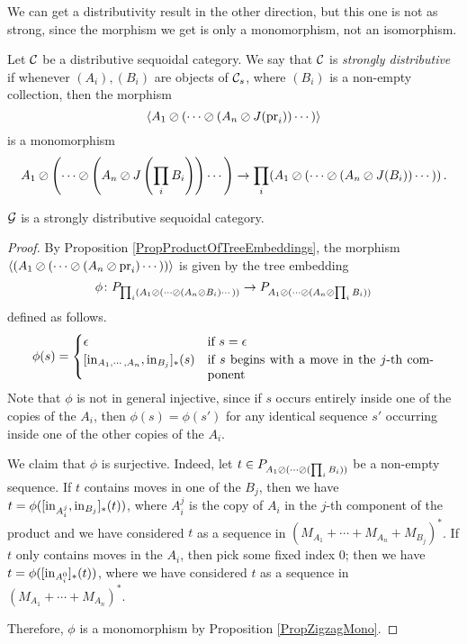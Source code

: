 \documentclass[11pt]{report}
\begin{document}
We can get a distributivity result in the other direction, but this one is not as strong, since the morphism we get is only a monomorphism, not an isomorphism.
\begin{definition}
  Let ${\mathcal{C}}$ be a distributive sequoidal category.  
  We say that ${\mathcal{C}}$ is \emph{strongly distributive} if whenever $(A_i),(B_i)$ are objects of ${\mathcal{C}}_s$, where $(B_i)$ is a non-empty collection, then the morphism
  \[
    \langle A_1 \oslash(\cdots \oslash (A_n \oslash J(\operatorname{pr}_i))\cdots)\rangle
    \]
  is a monomorphism
  \[
    A_1 \oslash\left(\cdots\oslash\left(A_n \oslash J\left(\prod_iB_i\right)\right)\cdots\right) \to \prod_i (A_1 \oslash (\cdots \oslash (A_n \oslash J(B_i))\cdots))\,.
    \]
\end{definition}

\begin{proposition}
  $\mathcal G$ is a strongly distributive sequoidal category.
\end{proposition}
\begin{proof}
  By Proposition \ref{PropProductOfTreeEmbeddings}, the morphism $\langle (A_1\oslash(\cdots\oslash(A_n \oslash\operatorname{pr}_i)\cdots))\rangle$ is given by the tree embedding 
  \[
    \phi\colon P_{\prod_i (A_1 \oslash(\cdots\oslash(A_n\oslash B_i)\cdots))} \to P_{A_1\oslash(\cdots\oslash(A_n\oslash \prod_iB_i))}
    \]
  defined as follows.
  \[
    \phi(s) = \begin{cases}
      \epsilon & \text{if $s=\epsilon$} \\
      [\inj_{A_1,\cdots,A_n},\inj_{B_j}]_*(s) & \parbox[t][][t]{180pt}{if $s$ begins with a move in the $j$-th component}
    \end{cases}
    \]
  Note that $\phi$ is not in general injective, since if $s$ occurs entirely inside one of the copies of the $A_i$, then $\phi(s)=\phi(s')$ for any identical sequence $s'$ occurring inside one of the other copies of the $A_i$.

  We claim that $\phi$ is surjective.  
  Indeed, let $t\in P_{A_1\oslash(\cdots \oslash(\prod_i B_i))}$ be a non-empty sequence.  
  If $t$ contains moves in one of the $B_j$, then we have $t=\phi([\operatorname{in}_{A_i^j},\operatorname{in}_{B_j}]_*(t))$, where $A_i^j$ is the copy of $A_i$ in the $j$-th component of the product and we have considered $t$ as a sequence in $(M_{A_1} + \cdots + M_{A_n} + M_{B_j})^*$.  
  If $t$ only contains moves in the $A_i$, then pick some fixed index $0$; then we have $t=\phi([\operatorname{in}_{A_i^0}]_*(t))$, where we have considered $t$ as a sequence in $(M_{A_1} + \cdots + M_{A_n})^*$.

  Therefore, $\phi$ is a monomorphism by Proposition \ref{PropZigzagMono}.
\end{proof}
\end{document}
